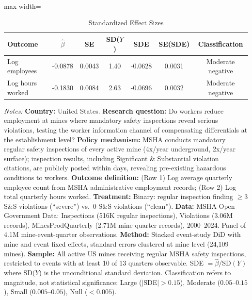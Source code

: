\begin{table}[htbp]
\centering
\caption{Standardized Effect Sizes}
\label{tab:sde}
\begin{adjustbox}{max width=\textwidth}
\begin{tabular}{lcccccc}
\toprule
Outcome & $\hat{\beta}$ & SE & SD($Y$) & SDE & SE(SDE) & Classification \\
\midrule
Log employees & -0.0878 & 0.0043 & 1.40 & -0.0628 & 0.0031 & Moderate negative \\
Log hours worked & -0.1830 & 0.0084 & 2.63 & -0.0696 & 0.0032 & Moderate negative \\
\bottomrule
\end{tabular}
\end{adjustbox}
\begin{tablenotes}[flushleft]\small
\item \textit{Notes:} \textbf{Country:} United States. \textbf{Research question:} Do workers reduce employment at mines where mandatory safety inspections reveal serious violations, testing the worker information channel of compensating differentials at the establishment level? \textbf{Policy mechanism:} MSHA conducts mandatory regular safety inspections of every active mine (4x/year underground, 2x/year surface); inspection results, including Significant \& Substantial violation citations, are publicly posted within days, revealing pre-existing hazardous conditions to workers. \textbf{Outcome definition:} (Row 1) Log average quarterly employee count from MSHA administrative employment records; (Row 2) Log total quarterly hours worked. \textbf{Treatment:} Binary: regular inspection finding $\geq$3 S\&S violations (``severe'') vs.\ 0 S\&S violations (``clean''). \textbf{Data:} MSHA Open Government Data: Inspections (516K regular inspections), Violations (3.06M records), MinesProdQuarterly (2.71M mine-quarter records), 2000--2024. Panel of 4.1M mine-event-quarter observations. \textbf{Method:} Stacked event-study DiD with mine and event fixed effects, standard errors clustered at mine level (24,109 mines). \textbf{Sample:} All active US mines receiving regular MSHA safety inspections, restricted to events with at least 10 of 13 quarters observable. SDE $= \hat{\beta} / \text{SD}(Y)$ where SD($Y$) is the unconditional standard deviation. Classification refers to magnitude, not statistical significance: Large ($|$SDE$| > 0.15$), Moderate ($0.05$--$0.15$), Small ($0.005$--$0.05$), Null ($< 0.005$).
\end{tablenotes}
\end{table}

